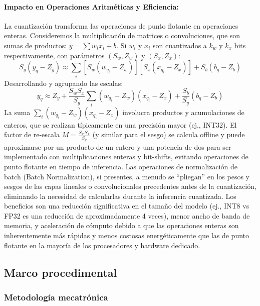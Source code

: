 \documentclass[12pt]{article}
\begin{document}
\paragraph{Impacto en Operaciones Aritméticas y Eficiencia:}
La cuantización transforma las operaciones de punto flotante en operaciones enteras. Consideremos la multiplicación de matrices o convoluciones, que son sumas de productos: $y = \sum w_i x_i + b$. Si $w_i$ y $x_i$ son cuantizados a $k_w$ y $k_x$ bits respectivamente, con parámetros $(S_w, Z_w)$ y $(S_x, Z_x)$:
\begin{equation}
S_y (y_q - Z_y) \approx \sum_i [S_w (w_{q_i} - Z_w)] [S_x (x_{q_i} - Z_x)] + S_b (b_q - Z_b)
\end{equation}
Desarrollando y agrupando las escalas:
\begin{equation}
y_q \approx Z_y + \frac{S_w S_x}{S_y} \sum_i (w_{q_i} - Z_w)(x_{q_i} - Z_x) + \frac{S_b}{S_y} (b_q - Z_b)
\label{eq:quantized_mac_full}
\end{equation}
La suma $\sum_i (w_{q_i} - Z_w)(x_{q_i} - Z_x)$ involucra productos y acumulaciones de enteros, que se realizan típicamente en una precisión mayor (ej., INT32). El factor de re-escala $M = \frac{S_w S_x}{S_y}$ (y similar para el sesgo) se calcula offline y puede aproximarse por un producto de un entero y una potencia de dos para ser implementado con multiplicaciones enteras y bit-shifts, evitando operaciones de punto flotante en tiempo de inferencia. Las operaciones de normalización de batch (Batch Normalization), si presentes, a menudo se ``pliegan'' en los pesos y sesgos de las capas lineales o convolucionales precedentes antes de la cuantización, eliminando la necesidad de calcularlas durante la inferencia cuantizada.
Los beneficios son una reducción significativa en el tamaño del modelo (ej., INT8 vs FP32 es una reducción de aproximadamente 4 veces), menor ancho de banda de memoria, y aceleración de cómputo debido a que las operaciones enteras son inherentemente más rápidas y menos costosas energéticamente que las de punto flotante en la mayoría de los procesadores y hardware dedicado.


\subsection{Marco procedimental}
\subsubsection{Metodología mecatrónica}
\label{ssec:metodologia_scrum}
\end{document}
